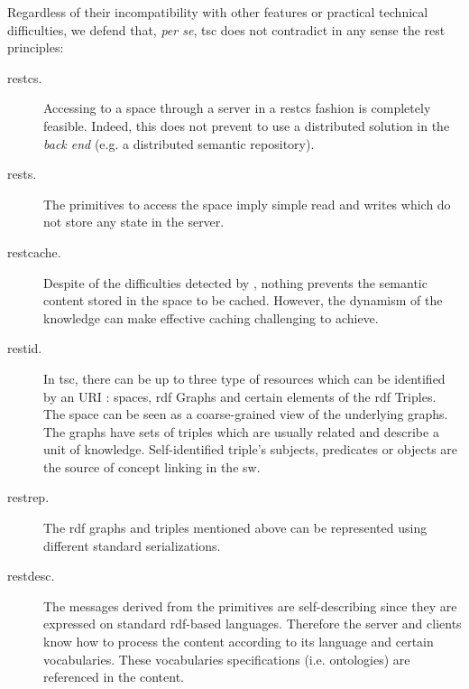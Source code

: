 Regardless of their incompatibility with other features or practical technical difficulties, %
we defend that, \emph{per se}, \ac{tsc} does not contradict in any sense the \ac{rest} principles:
\begin{description}
 \item[\ac{restcs}.] Accessing to a space through a server in a \ac{restcs} fashion is completely feasible.
		      Indeed, this does not prevent to use a distributed solution in the \emph{back end} (e.g. a distributed semantic repository).
 \item[\ac{rests}.] The primitives to access the space imply simple read and writes which do not store any state in the server.
 \item[\ac{restcache}. ] Despite of the difficulties detected by \citet{fensel_tsc_2007}, nothing prevents the semantic content stored in the space to be cached.
                          However, the dynamism of the knowledge can make effective caching challenging to achieve.
	\item[\ac{restid}.]
			 In \ac{tsc}, there can be up to three type of resources which can be identified by an URI : spaces, \ac{rdf} Graphs and certain elements of the \ac{rdf} Triples.
	                 The space can be seen as a coarse-grained view of the underlying graphs.
	                 The graphs have sets of triples which are usually related and describe a unit of knowledge. %
	                 Self-identified triple's subjects, predicates or objects are the source of concept linking in the \ac{sw}.
	\item[\ac{restrep}.] The \ac{rdf} graphs and triples mentioned above can be represented using different standard serializations.
	\item[\ac{restdesc}.] The messages derived from the primitives are self-describing since they are expressed on standard \ac{rdf}-based languages. %
				Therefore the server and clients know how to process the content according to its language and certain vocabularies.
				These vocabularies specifications (i.e. ontologies) are referenced in the content.

\end{description}
